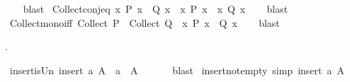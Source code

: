 \begin{isabellebody}
%
\isadelimproof
\ \ %
\endisadelimproof
%
\isatagproof
{}\isamarkupfalse%
\ blast%
\endisatagproof
{\isafoldproof}%
%
\isadelimproof
\isanewline
%
\endisadelimproof
\isanewline
{}\isamarkupfalse%
\ Collect{\isacharunderscore}{\kern0pt}conj{\isacharunderscore}{\kern0pt}eq{\isacharcolon}{\kern0pt}\ {\isachardoublequoteopen}{\isacharbraceleft}{\kern0pt}x{\isachardot}{\kern0pt}\ P\ x\ {\isasymand}\ Q\ x{\isacharbraceright}{\kern0pt}\ {\isacharequal}{\kern0pt}\ {\isacharbraceleft}{\kern0pt}x{\isachardot}{\kern0pt}\ P\ x{\isacharbraceright}{\kern0pt}\ {\isasyminter}\ {\isacharbraceleft}{\kern0pt}x{\isachardot}{\kern0pt}\ Q\ x{\isacharbraceright}{\kern0pt}{\isachardoublequoteclose}\isanewline
%
\isadelimproof
\ \ %
\endisadelimproof
%
\isatagproof
{}\isamarkupfalse%
\ blast%
\endisatagproof
{\isafoldproof}%
%
\isadelimproof
\isanewline
%
\endisadelimproof
\isanewline
{}\isamarkupfalse%
\ Collect{\isacharunderscore}{\kern0pt}mono{\isacharunderscore}{\kern0pt}iff{\isacharcolon}{\kern0pt}\ {\isachardoublequoteopen}Collect\ P\ {\isasymsubseteq}\ Collect\ Q\ {\isasymlongleftrightarrow}\ {\isacharparenleft}{\kern0pt}{\isasymforall}x{\isachardot}{\kern0pt}\ P\ x\ {\isasymlongrightarrow}\ Q\ x{\isacharparenright}{\kern0pt}{\isachardoublequoteclose}\isanewline
%
\isadelimproof
\ \ %
\endisadelimproof
%
\isatagproof
{}\isamarkupfalse%
\ blast%
\endisatagproof
{\isafoldproof}%
%
\isadelimproof
%
\endisadelimproof
%
\begin{isamarkuptext}%
\medskip {}.%
\end{isamarkuptext}\isamarkuptrue%
\isamarkupfalse%
\ insert{\isacharunderscore}{\kern0pt}is{\isacharunderscore}{\kern0pt}Un{\isacharcolon}{\kern0pt}\ {\isachardoublequoteopen}insert\ a\ A\ {\isacharequal}{\kern0pt}\ {\isacharbraceleft}{\kern0pt}a{\isacharbraceright}{\kern0pt}\ {\isasymunion}\ A{\isachardoublequoteclose}\isanewline
\ \ %
\isanewline
%
\isadelimproof
\ \ %
\endisadelimproof
%
\isatagproof
{}\isamarkupfalse%
\ blast%
\endisatagproof
{\isafoldproof}%
%
\isadelimproof
\isanewline
%
\endisadelimproof
\isanewline
{}\isamarkupfalse%
\ insert{\isacharunderscore}{\kern0pt}not{\isacharunderscore}{\kern0pt}empty\ {\isacharbrackleft}{\kern0pt}simp{\isacharbrackright}{\kern0pt}{\isacharcolon}{\kern0pt}\ {\isachardoublequoteopen}insert\ a\ A\ {\isasymnoteq}\ {\isacharbraceleft}{\kern0pt}{\isacharbraceright}{\kern0pt}{\isachardoublequoteclose}\isanewline

\end{isabellebody}
